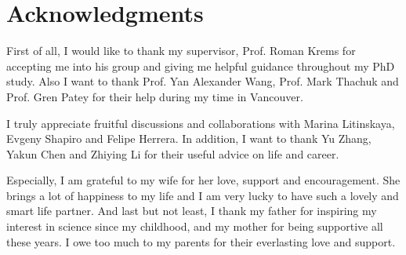 
\chapter{Acknowledgments}


First of all, I would like to thank my supervisor, Prof. Roman Krems for accepting me into his group and giving me helpful guidance throughout my PhD study.
Also I want to thank Prof. Yan Alexander Wang, Prof. Mark Thachuk
and Prof. Gren Patey for their help during my time in Vancouver.
 
I truly appreciate fruitful discussions and collaborations with Marina Litinskaya, Evgeny Shapiro and Felipe Herrera. In addition, I want to thank Yu Zhang, Yakun Chen and Zhiying Li for their useful advice on life and career.
 
 
Especially, I am grateful to my wife for her love, support and encouragement. She brings a lot of happiness to my life and I am very
lucky to have such a lovely and smart life partner.
And last but not least, I thank my father for inspiring my
interest in science since my childhood, and my mother for being supportive all these years. I owe too much to my parents
for their everlasting love and support.
